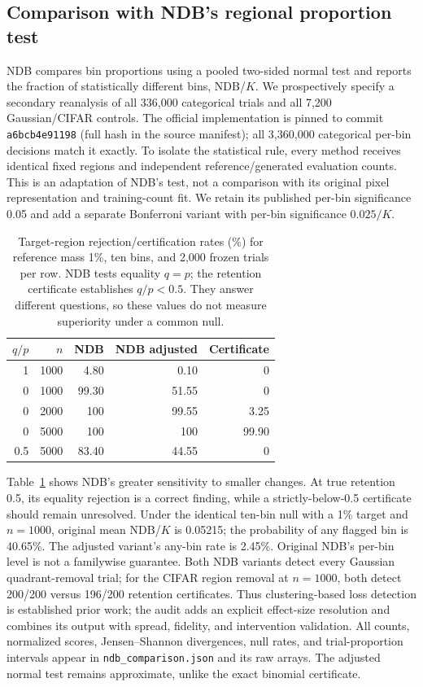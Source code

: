 \subsection{Comparison with NDB's regional proportion test}
NDB\cite{richardson2018ndb} compares bin proportions using a pooled two-sided
normal test and reports the fraction of statistically different bins, NDB/$K$.
We prospectively specify a secondary reanalysis of all 336,000 categorical
trials and all 7,200 Gaussian/CIFAR controls. The official implementation is
pinned to commit \texttt{a6bcb4e91198} (full hash in the source manifest); all
3,360,000 categorical per-bin decisions match it exactly. To isolate the
statistical rule, every method receives identical fixed regions and independent
reference/generated evaluation counts. This is an adaptation of NDB's test,
not a comparison with its original pixel representation and training-count fit.
We retain its published per-bin significance 0.05 and add a separate
Bonferroni variant with per-bin significance $0.025/K$.

\begin{table}[t]
\centering\small
\begin{tabular}{rrrrr}
\toprule
$q/p$ & $n$ & NDB & NDB adjusted & Certificate\\
\midrule
1 &1000&4.80&0.10&0\\
0 &1000&99.30&51.55&0\\
0 &2000&100&99.55&3.25\\
0 &5000&100&100&99.90\\
0.5 &5000&83.40&44.55&0\\
\bottomrule
\end{tabular}
\caption{Target-region rejection/certification rates (\%) for reference mass
1\%, ten bins, and 2,000 frozen trials per row. NDB tests equality $q=p$;
the retention certificate establishes $q/p<0.5$. They answer different
questions, so these values do not measure superiority under a common null.}
\label{tab:support-ndb}
\end{table}

Table~\ref{tab:support-ndb} shows NDB's greater sensitivity to smaller changes.
At true retention 0.5, its equality rejection is a correct finding, while a
strictly-below-0.5 certificate should remain unresolved. Under the identical
ten-bin null with a 1\% target and $n=1000$, original mean NDB/$K$ is 0.05215;
the probability of any flagged bin is 40.65\%. The adjusted variant's any-bin
rate is 2.45\%. Original NDB's per-bin level is not a familywise guarantee.
Both NDB variants detect every Gaussian quadrant-removal trial; for the CIFAR
region removal at $n=1000$, both detect 200/200 versus 196/200 retention
certificates. Thus clustering-based loss detection is established prior work;
the audit adds an explicit effect-size resolution and combines its output with
spread, fidelity, and intervention validation. All counts, normalized scores,
Jensen--Shannon divergences, null rates, and trial-proportion intervals appear
in \texttt{ndb\_comparison.json} and its raw arrays. The adjusted normal test
remains approximate, unlike the exact binomial certificate.

